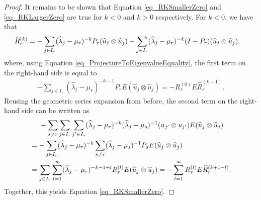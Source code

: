 \documentclass[a4paper,11pt]{article} %
\numberwithin{equation}{section}
\theoremstyle{definition}
\theoremstyle{remark}
\theoremstyle{plain}
\begin{document}
\begin{proof}
  It remains to be shown that Equation \eqref{eq_RKSmallerZero} and
  \eqref{eq_RKLargerZero} are true for \( k < 0 \) and \( k > 0 \) respectively. 
  For \( k < 0 \), we have that
  \begin{align}
          \widehat{R}_{r}^{ (k) } 
    & = 
        - \sum_{ j \in I_{r} } 
          ( \widehat{ \lambda }_{j} - \mu_{r} )^{-k} 
          P_{r} ( \widehat{u}_{j} \otimes \widehat{u}_{j} )
        - \sum_{ j \in I_{r} } 
          ( \widehat{ \lambda }_{j} - \mu_{r} )^{-k} 
          ( I - P_{r} ) ( \widehat{u}_{j} \otimes \widehat{u}_{j} ),
    \notag 
  \end{align}
  where, using Equation \eqref{eq_ProjectureToEigenvalueEquality}, the first
  term on the right-hand side is equal to
  \begin{align}
      - \sum_{ j \in I_{r} } 
        ( \widehat{ \lambda }_{j} - \mu_{r} )^{ - k - 1 } 
        P_{r} E ( \widehat{u}_{j} \otimes \widehat{u}_{j} ) 
    = 
      - R_{r}^{ (0) } E \widehat{R}_{r}^{ ( k + 1 ) }.
  \end{align}
  Reusing the geometric series expansion from before, the second term on the
  right-hand side can be written as
  \begin{align}
    & \ \ \ \
        - \sum_{s \ne r} \sum_{ j \in I_{r} } \sum_{ j' \in I_{s} } 
          ( \widehat{ \lambda }_{j} - \mu_{r} )^{-k} 
          ( \widehat{ \lambda }_{j} - \mu_{s} )^{-1}
          ( u_{j'} \otimes u_{j'} ) E ( \widehat{u}_{j} \otimes \widehat{u}_{j} ) 
    \\
    & = 
        - \sum_{ j \in I_{r} } ( \widehat{ \lambda }_{j} - \mu_{r} )^{-k} 
          \sum_{ s \ne r } 
          ( \widehat{ \lambda }_{j} - \mu_{s} )^{-1}
          P_{s} E ( \widehat{u}_{j} \otimes \widehat{u}_{j} )
    \notag
    \\
    & =
          \sum_{ j \in I_{r} } \sum_{l = 1}^{ \infty } 
          ( \widehat{ \lambda }_{j} - \mu_{r} )^{-k - 1 + l} 
          R_{r}^{ (l) } E ( \widehat{u}_{j} \otimes \widehat{u}_{j} ) 
    = 
        - \sum_{l = 1}^{ \infty } 
          R_{r}^{ (l) } E \widehat{R}_{r}^{ (k + 1 - l) }.
    \notag
  \end{align}
  Together, this yields Equation \eqref{eq_RKSmallerZero}.


\end{proof}
\end{document}
